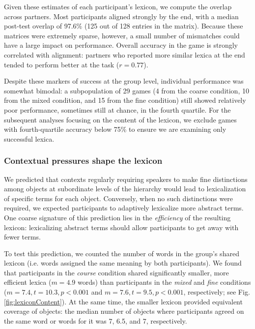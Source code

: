 \documentclass[10pt,letterpaper]{article}
\begin{document}
Given these estimates of each participant's lexicon, we compute the overlap across partners. Most participants aligned strongly by the end, with a median post-test overlap of 97.6\% (125 out of 128 entries in the matrix). Because these matrices were extremely sparse, however, a small number of mismatches could have a large impact on performance. Overall accuracy in the game is strongly correlated with alignment: partners who reported more similar lexica at the end tended to perform better at the task ($r = 0.77$).  

Despite these markers of success at the group level, individual performance was somewhat bimodal: a subpopulation of 29 games (4 from the coarse condition, 10 from the mixed condition, and 15 from the fine condition) still showed relatively poor performance, sometimes still at chance, in the fourth quartile. For the subsequent analyses focusing on the content of the lexicon, we exclude games with fourth-quartile accuracy below 75\% to ensure we are examining only successful lexica.

\subsubsection{Contextual pressures shape the lexicon}

We predicted that contexts regularly requiring speakers to make fine distinctions among objects at subordinate levels of the hierarchy would lead to lexicalization of specific terms for each object. Conversely, when no such distinctions were required, we expected participants to adaptively lexicalize more abstract terms. One coarse signature of this prediction lies in the \emph{efficiency} of the resulting lexicon: lexicalizing abstract terms should allow participants to get away with fewer terms.

To test this prediction, we counted the number of words in the group's shared lexicon (i.e. words assigned the same meaning by both participants). We found that participants in the \emph{course} condition shared significantly smaller, more efficient lexica ($m = 4.9$ words) than participants in the \emph{mixed} and \emph{fine} conditions ($m = 7.4, t = 10.3, p <0.001$ and $m = 7.6, t = 9.5, p < 0.001$, respectively; see Fig. \ref{fig:lexiconContent}). At the same time, the smaller lexicon provided equivalent coverage of objects: the median number of objects where participants agreed on the same word or words for it was 7, 6.5, and 7, respectively.
\end{document}
